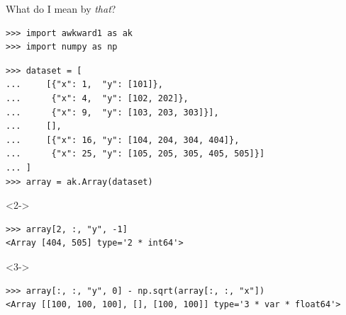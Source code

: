 \documentclass[aspectratio=169]{beamer}
\begin{document}

\begin{frame}[fragile]{What do I mean by {\it that}?}
\vspace{0.3 cm}

\small
\begin{verbatim}
>>> import awkward1 as ak
>>> import numpy as np
\end{verbatim}

\begin{verbatim}
>>> dataset = [
...     [{"x": 1,  "y": [101]},
...      {"x": 4,  "y": [102, 202]},
...      {"x": 9,  "y": [103, 203, 303]}],
...     [],
...     [{"x": 16, "y": [104, 204, 304, 404]},
...      {"x": 25, "y": [105, 205, 305, 405, 505]}]
... ]
>>> array = ak.Array(dataset)
\end{verbatim}

\begin{uncoverenv}<2->
\begin{verbatim}
>>> array[2, :, "y", -1]
<Array [404, 505] type='2 * int64'>
\end{verbatim}
\end{uncoverenv}

\begin{uncoverenv}<3->
\begin{verbatim}
>>> array[:, :, "y", 0] - np.sqrt(array[:, :, "x"])
<Array [[100, 100, 100], [], [100, 100]] type='3 * var * float64'>
\end{verbatim}
\end{uncoverenv}
\end{frame}
\end{document}

